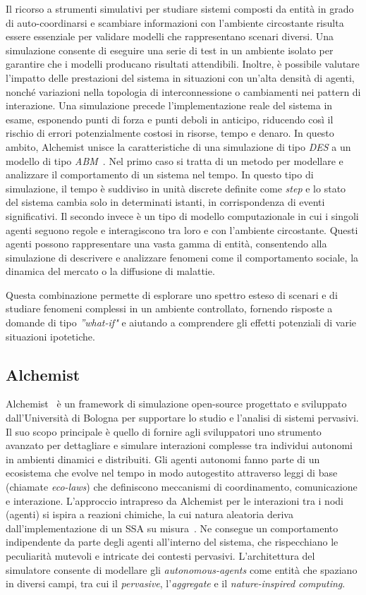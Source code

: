Il ricorso a strumenti simulativi per studiare sistemi composti da entità in grado di auto-coordinarsi e scambiare informazioni con l'ambiente circostante risulta essere essenziale per validare modelli che rappresentano scenari diversi. Una simulazione consente di eseguire una serie di test in un ambiente isolato per garantire che i modelli producano risultati attendibili. Inoltre, è possibile valutare l'impatto delle prestazioni del sistema in situazioni con un'alta densità di agenti, nonché variazioni nella topologia di interconnessione o cambiamenti nei pattern di interazione. Una simulazione precede l'implementazione reale del sistema in esame, esponendo punti di forza e punti deboli in anticipo, riducendo così il rischio di errori potenzialmente costosi in risorse, tempo e denaro.
In questo ambito, Alchemist unisce la caratteristiche di una simulazione di tipo \textit{\ac{DES}} a un modello di tipo \textit{\ac{ABM}}~\cite{PMV2011}. Nel primo caso si tratta di un metodo per modellare e analizzare il comportamento di un sistema nel tempo. In questo tipo di simulazione, il tempo è suddiviso in unità discrete definite come \textit{step} e lo stato del sistema cambia solo in determinati istanti, in corrispondenza di eventi significativi.
Il secondo invece è un tipo di modello computazionale in cui i singoli agenti seguono regole e interagiscono tra loro e con l'ambiente circostante. Questi agenti possono rappresentare una vasta gamma di entità, consentendo alla simulazione di descrivere e analizzare fenomeni come il comportamento sociale, la dinamica del mercato o la diffusione di malattie. 

Questa combinazione permette di esplorare uno spettro esteso di scenari e di studiare fenomeni complessi in un ambiente controllato, fornendo risposte a domande di tipo \textit{''what-if"} e aiutando a comprendere gli effetti potenziali di varie situazioni ipotetiche.
\subsection{Alchemist}
Alchemist~\cite{Pianini_2013} è un framework di simulazione open-source progettato e sviluppato dall'Università di Bologna per supportare lo studio e l'analisi di sistemi pervasivi.  Il suo scopo principale è quello di fornire agli sviluppatori uno strumento avanzato per dettagliare e simulare interazioni complesse tra individui autonomi in ambienti dinamici e distribuiti. Gli agenti autonomi fanno parte di un ecosistema che evolve nel tempo in modo autogestito attraverso leggi di base (chiamate \textit{eco-laws}) che definiscono meccanismi di coordinamento, comunicazione e interazione. 
L'approccio intrapreso da Alchemist per le interazioni tra i nodi (agenti) si ispira a reazioni chimiche, la cui natura aleatoria deriva dall'implementazione di un \ac{SSA} su misura~\cite{PMV2011}. Ne consegue  un comportamento indipendente da parte degli agenti all'interno del sistema, che rispecchiano le peculiarità mutevoli e intricate dei contesti pervasivi.
L'architettura del simulatore consente di modellare gli \textit{autonomous-agents} come entità che spaziano in diversi campi, tra cui il \textit{pervasive}, l'\textit{aggregate} e il \textit{nature-inspired computing}.

